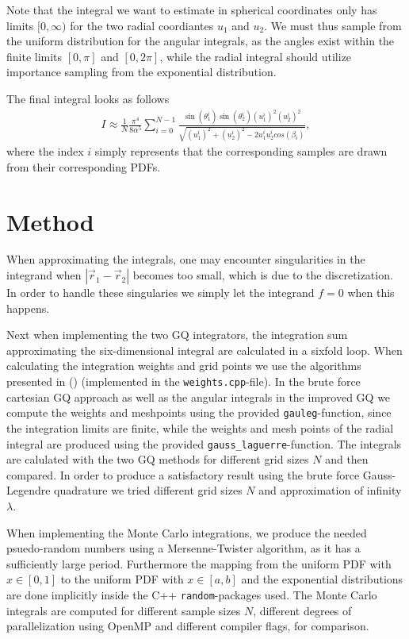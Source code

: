 \documentclass[10pt, twocolumn]{aastex62}
\begin{document}
Note that the integral we want to estimate in spherical coordinates
only has limits $[0, \infty)$ for the two radial coordiantes $u_1$ and $u_2$. We
must thus sample from the uniform distribution for the angular integrals, as the
angles exist within the finite limits $[0,\pi]$ and $[0, 2\pi]$, while the radial
integral should utilize importance sampling from the exponential distribution.

The final integral looks as follows
\begin{align}
	I \approx \frac{1}{N}\frac{\pi^4}{8\alpha^5}\sum^{N-1}_{i=0}\frac{\sin
	(\theta_1^i)\sin(\theta_2^i)(u_1^i)^2(u_2^i)^2}{\sqrt{(u_1^i)^2 + (u_2^i)^2 - 2u_1^iu_2^icos(\beta_i)}},
\end{align}
where the index $i$ simply represents that the corresponding samples are drawn
from their corresponding PDFs.
\section{Method} \label{sec:method}
When approximating the integrals, one may encounter singularities in the
integrand when $|\vec{r}_1 - \vec{r}_2|$ becomes too small, which is due to the
discretization. In order to handle these singularies we simply let the integrand
$f=0$ when this happens. 

Next when implementing the two GQ integrators, the integration sum approximating
the six-dimensional integral are calculated in a sixfold loop. When
calculating the integration weights and grid points we use the algorithms
presented in (\cite{press:2007}) (implemented in the \texttt{weights.cpp}-file).
In the brute force cartesian GQ approach as well as the angular integrals in the
improved GQ we compute the weights and meshpoints using the provided
\texttt{gauleg}-function, since the integration limits are finite, while the weights
and mesh points of the radial integral are produced using the provided
\texttt{gauss\_laguerre}-function. The integrals are calulated with the two GQ
methods for different grid sizes $N$ and then compared. In order to produce a
satisfactory result using the brute force Gauss-Legendre quadrature we tried
different grid sizes $N$ and approximation of infinity $\lambda$.

When implementing the Monte Carlo integrations, we produce the needed
psuedo-random numbers using a Mersenne-Twister algorithm, as it has a
sufficiently large period. Furthermore the mapping from the uniform PDF with
$x\in[0,1]$ to the uniform PDF with $x\in[a,b]$ and the exponential
distributions are done implicitly inside the C++ \texttt{random}-packages used.
The Monte Carlo integrals are computed for different sample sizes $N$,
different degrees of parallelization using OpenMP and different compiler flags,
for comparison. 
\end{document}
